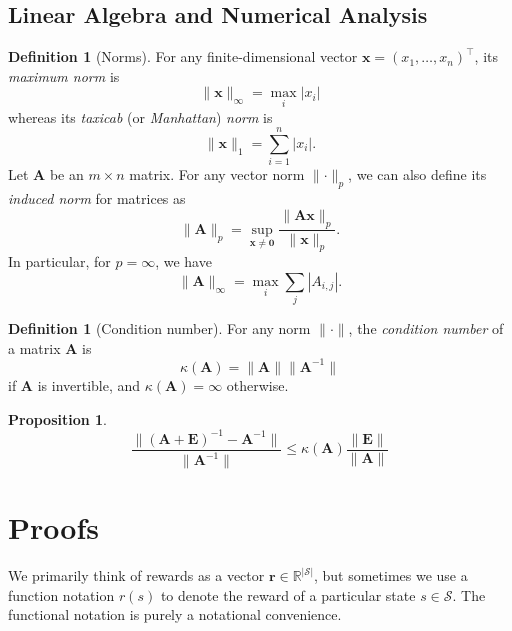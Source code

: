 \documentclass{article}
\newtheorem{proposition}[theorem]{Proposition}
\theoremstyle{definition}
\newtheorem{definition}[theorem]{Definition}
\begin{document}
\subsection{Linear Algebra and Numerical Analysis}

\begin{definition}[Norms]
  For any finite-dimensional vector $\mathbf{x} = (x_1, \dots, x_n)^\intercal$,
  its \emph{maximum norm} is
  \[
    \lVert \mathbf{x} \rVert_\infty = \max_i |x_i|
  \]
  whereas its \emph{taxicab} (or \emph{Manhattan}) \emph{norm} is
  \[
    \lVert \mathbf{x} \rVert_1 = \sum_{i = 1}^n |x_i|.
  \]
  Let $\mathbf{A}$ be an $m \times n$ matrix. For any vector norm $\lVert
  \cdot \rVert_p$, we can also define its \emph{induced norm} for matrices as
  \[
    \lVert \mathbf{A} \rVert_p = \sup_{\mathbf{x} \ne \mathbf{0}} \frac{\lVert
      \mathbf{Ax} \rVert_p}{\lVert \mathbf{x} \rVert_p}.
  \]
  In particular, for $p = \infty$, we have
  \[
    \lVert \mathbf{A} \rVert_\infty = \max_i \sum_{j} |A_{i,j}|.
  \]
\end{definition}

\begin{definition}[Condition number]
  For any norm $\lVert \cdot \rVert$, the \emph{condition number} of a matrix
  $\mathbf{A}$ is
  \[
    \kappa(\mathbf{A}) = \lVert \mathbf{A} \rVert \lVert \mathbf{A}^{-1} \rVert
  \]
  if $\mathbf{A}$ is invertible, and $\kappa(\mathbf{A}) = \infty$ otherwise.
\end{definition}

\begin{proposition} \label{prop:condition_number}
  \[
    \frac{\lVert (\mathbf{A} + \mathbf{E})^{-1} - \mathbf{A}^{-1} \rVert}{\lVert
    \mathbf{A}^{-1} \rVert} \le \kappa(\mathbf{A})\frac{\lVert \mathbf{E}
    \rVert}{\lVert \mathbf{A} \rVert}
  \]
\end{proposition}

\section{Proofs}

We primarily think of rewards as a vector $\mathbf{r} \in
\mathbb{R}^{|\mathcal{S}|}$, but sometimes we use a function notation $r(s)$ to
denote the reward of a particular state $s \in \mathcal{S}$. The functional
notation is purely a notational convenience.
\end{document}
